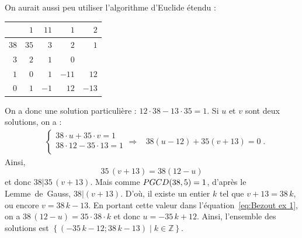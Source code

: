 \begin{ex}
                  On aurait aussi peu utiliser l'algorithme d'Euclide \'etendu :
                  \begin{center}
							\begin{tabular}{|r|r|r|r|r|} \hline
							  & $1$ & $11$ & $1$ & $2$ \\ \hline
							$38$ & $35$ & $3$ & $2$ & $1$ \\ \hline
							$3$ & $2$ & $1$ & $0$ &   \\ \hline
							$1$ & $0$ & $1$ & $-11$ & $12$ \\ \hline
							$0$ & $1$ & $-1$ & $12$ & $-13$ \\ \hline
							\end{tabular}
                  \end{center}
                  
                  On a donc une solution particuli\`ere : $12 \cdot 38 - 13 \cdot 35 = 1$.
                  Si $u$ et $v$ sont deux solutions, on a : 
                        \begin{align*}
                        &
                              \left\lbrace
                                    \begin{array}{l}
                                          38 \cdot  u + 35 \cdot v  = 1 \\
                                          38 \cdot 12 - 35 \cdot 13 = 1 \\
                                    \end{array}
                              \right.
                        \Rightarrow
                        &     
                                    38 (u - 12) + 35 (v + 13) = 0      \;.
                        \end{align*}
                        Ainsi,
                              \begin{equation}
                                    35 \, (v + 13) = 38 (12 - u) \label{eq:Bezout ex 1}
                              \end{equation}
                        et donc $38 | 35 \, (v + 13)$.
                        Mais comme $PGCD(38,5) = 1$, d'apr\`es le Lemme~de~Gauss, $38 | (v + 13)$.
                        D'o\`u, il existe un entier $k$ tel que $v + 13 = 38 \, k$, ou encore $v = 38\,k - 13$.
                        En portant cette valeur dans l'\'equation~\eqref{eq:Bezout ex 1}, on a 
                              $38 \, (12 - u) = 35 \cdot 38 \cdot k$ et donc 
                              $u = - 35 \, k + 12$.
                        Ainsi, l'ensemble des solutions est 
                              $\left\lbrace (-35\,k-12 ; 38\,k-13) \mid k \in \mathbb{Z} \right\rbrace$.
            \end{ex}


